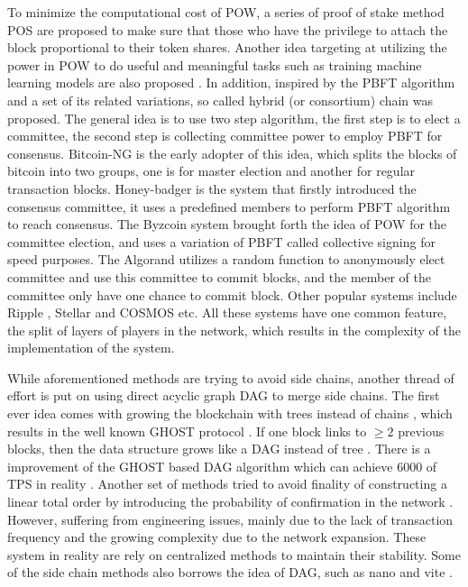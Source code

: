 To minimize the computational cost of POW, a series of proof of stake method POS \cite{duffield2018dash, tron2018, david2017ouroboros, wood2014ethereum, goodman2014tezos} are proposed to make sure that those who have the privilege to attach the block proportional to their token shares.
Another idea targeting at utilizing the power in POW to do useful and meaningful tasks such as training machine learning models are also proposed \cite{matthew2017aion}.
In addition, inspired by the PBFT algorithm \cite{castro1999practical} and a set of its related variations, so called hybrid (or consortium) chain was proposed. 
The general idea is to use two step algorithm, the first step is to elect a committee, the second step is collecting committee power to employ PBFT for consensus.
Bitcoin-NG \cite{eyal2016bitcoin} is the early adopter of this idea, which splits the blocks of bitcoin into two groups, one is for master election and another for regular transaction blocks. 
Honey-badger \cite{miller2016honey} is the system that firstly introduced the consensus committee, it uses a predefined members to perform PBFT algorithm to reach consensus.  
The Byzcoin system \cite{kogias2016enhancing} brought forth the idea of POW for the committee election, and uses a variation of PBFT called collective signing for speed purposes.
The Algorand \cite{gilad2017algorand} utilizes a random function to anonymously elect committee and use this committee to commit blocks, and the member of the committee only have one chance to commit block.
Other popular systems include Ripple \cite{schwartz2014ripple}, Stellar \cite{mazieres2015stellar} and COSMOS \cite{kwon2016cosmos} etc.
All these systems have one common feature, the split of layers of players in the network, which results in the complexity of the implementation of the system.

While aforementioned methods are trying to avoid side chains, another thread of effort is put on using direct acyclic graph DAG to merge side chains.
The first ever idea comes with growing the blockchain with trees instead of chains \cite{sompolinsky2013accelerating}, which results in the well known GHOST protocol \cite{sompolinsky2015secure}.
If one block links to $\geq 2$ previous blocks, then the data structure grows like a DAG instead of tree \cite{sompolinsky2016spectre, sompolinskyphantom, lewenberg2015inclusive}.
There is a improvement of the GHOST based DAG algorithm which can achieve $6000$ of TPS in reality \cite{li2018scaling}.
Another set of methods tried to avoid finality of constructing a linear total order by introducing the probability of confirmation in the network \cite{popov2016tangle, churyumov2016byteball}. 
However, suffering from engineering issues, mainly due to the lack of transaction frequency and the growing complexity due to the network expansion.
These system in reality are rely on centralized methods to maintain their stability.
Some of the side chain methods also borrows the idea of DAG, such as nano \cite{lemahieu2018nano} and vite \cite{liuvite}.

